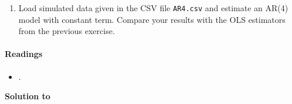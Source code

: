 \begin{enumerate}
\begin{enumerate}
    \item Load simulated data given in the CSV file \texttt{AR4.csv} and estimate an AR(4) model with constant term.
    Compare your results with the OLS estimators from the previous exercise.
 	\end{enumerate}
\end{enumerate}

\paragraph{Readings}
\begin{itemize}
	\item \textcite{Lutkepohl_2004_UnivariateTimeSeries}.
\end{itemize}


\begin{solution}\textbf{Solution to }
\ifDisplaySolutions

\fi
\newpage
\end{solution}